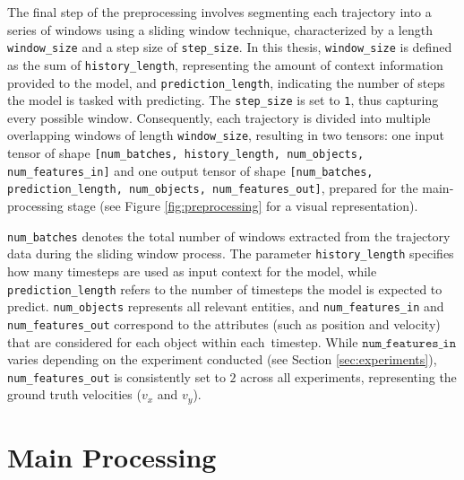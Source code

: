 \parbox{\textwidth}{
The final step of the preprocessing involves segmenting each trajectory into a series of windows using a sliding window technique, characterized by a length \texttt{window\_size} and a step size of \texttt{step\_size}. In this thesis, \texttt{window\_size} is defined as the sum of \texttt{history\_length}, representing the amount of context information provided to the model, and \texttt{prediction\_length}, indicating the number of steps the model is tasked with predicting. The \texttt{step\_size} is set to \texttt{1}, thus capturing every possible window. Consequently, each trajectory is divided into multiple overlapping windows of length \texttt{window\_size}, resulting in two tensors: one input tensor of shape \texttt{[num\_batches, history\_length, num\_objects, num\_features\_in]} and one output tensor of shape \texttt{[num\_batches, prediction\_length, num\_objects, num\_features\_out]}, prepared for the main-processing stage (see Figure \ref{fig:preprocessing} for a visual representation).
}

\texttt{num\_batches} denotes the total number of windows extracted from the trajectory data during the sliding window process. The parameter \texttt{history\_length} specifies how many timesteps are used as input context for the model, while \texttt{prediction\_length} refers to the number of timesteps the model is expected to predict. \texttt{num\_objects} represents all relevant entities, and \texttt{num\_features\_in} and \texttt{num\_features\_out} correspond to the attributes (such as position and velocity) that are considered for each object within each~timestep. While $\texttt{num\_features\_in}$ varies depending on the experiment conducted (see Section \ref{sec:experiments}), \texttt{num\_features\_out} is consistently set to $2$ across all experiments, representing the ground truth velocities (\(v_x\) and \(v_y\)).


\section{Main Processing}
\label{sec:main_proc}

